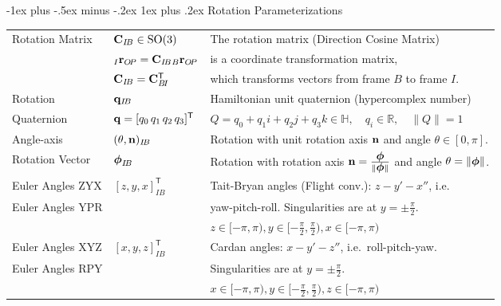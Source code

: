 \documentclass[10pt,landscape,a4paper]{article}
\makeatletter
\renewcommand{\subsubsection}{\@startsection{subsubsection}{3}{0mm}%
                                {-1ex plus -.5ex minus -.2ex}%
                                {1ex plus .2ex}%
                                {\normalfont\small\bfseries}}
\newcommand\norm[1]{\lVert #1 \rVert}
\newcommand\transpose{\mathsf{T}}
\newcommand\pos[3]{{}_#1\vr_{#2\!#3}}
\newcommand\comat[2]{\vC_{#1\!#2}}
\newcommand\quat[2]{\vq_{#1\!#2}}
\newcommand\angleaxis[2]{(\theta,\vn)_{#1\!#2}}
\newcommand\rotvec[2]{\vvph_{#1\!#2}}
\makeatother
\begin{document}
\begin{multicols}{2}
\subsubsection{Rotation Parameterizations}
\begin{tabular}{ll@{}l@{}}
\hline
Rotation Matrix& $\comat{I}{B} \in \mathrm{SO}(3)$ & The rotation matrix (Direction Cosine Matrix)  \\  
  & $ \pos{I}{O}{P} = \comat{I}{B} \pos{B}{O}{P}$ & is a coordinate transformation matrix,  \\
& $\comat{I}{B} = \comat{B}{I}^\transpose$ & which transforms vectors from frame $B$ to frame $I$. \\  \hline 
 Rotation  & $\quat{I}{B}$ &  Hamiltonian unit quaternion (hypercomplex number)\\
Quaternion &  $\vq = [ q_0 \, q_1  \, q_2  \,  q_3 ]^\transpose $ & $Q = q_0 + q_1 i + q_2 j + q_3 k \in \mathbb{H}, \quad q_i \in \mathbb{R}, \quad \norm{Q}= 1$ \\ \hline
Angle-axis & $\angleaxis{I}{B}$ &   Rotation with unit rotation axis $\mathbf n$ and angle $\theta \in [0, \pi]$. \\ \hline
Rotation Vector & $ \rotvec{I}{B} $  &  Rotation with rotation axis $\vn = \frac{\vvph}{\norm{\vvph}}$ and angle $\theta = \norm{\vvph}$. \\ \hline
Euler Angles ZYX &  $[z, y, x]^\transpose_{I\!B}$  & Tait-Bryan angles (Flight conv.): $z-y'-x''$, i.e.\   \\
Euler Angles YPR &  & yaw-pitch-roll. Singularities are at $y=\pm\frac{\pi}{2}$. \\
 &  & $z\in[-\pi,\pi), y\in[-\frac{\pi}{2},\frac{\pi}{2}), x\in[-\pi,\pi)$  \\  \hline
Euler Angles XYZ &  $[x, y, z]^\transpose_{I\!B}$ & Cardan angles: $x-y'-z''$, i.e.\ roll-pitch-yaw. \\
Euler Angles RPY & &  Singularities are at $y=\pm\frac{\pi}{2}$.  \\
 &  & $x\in[-\pi,\pi), y\in[-\frac{\pi}{2},\frac{\pi}{2}), z\in[-\pi,\pi)$  \\  \hline
\end{tabular} %


\end{multicols}
\end{document}
